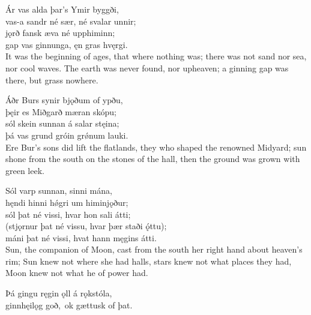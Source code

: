 \bva Ár vas alda \hld þar's Ymir byggði,\footnotemark[6] \\%
vas-a sandr né sær, \hld né svalar unnir; \\%
jǫrð fansk æva \hld né upphiminn; \\%
gap vas ginnunga, \hld ęn gras hvęrgi.
\\%

\bvb It was the beginning of ages, that where nothing was\footnotemark[8]; there was not sand nor sea, nor cool waves. The earth was never found, nor upheaven; a ginning gap was there, but grass nowhere. 

\bva Áðr Burs synir \hld bjǫðum of ypðu, \\%
þęir es Miðgarð \hld mæran skópu; \\%
sól skein sunnan \hld á salar stęina; \\%
þá vas grund gróin \hld grǿnum lauki.\\%

\bvb Ere Bur's sons did lift the flatlands, they who shaped the renowned Midyard; sun shone from the south on the stones of the hall, then the ground was grown with green leek.

\bva Sól varp sunnan, \hld sinni mána,\footnotemark[10] \\%
hęndi hinni hǿgri \hld um himinjǫður; \\%
sól þat né vissi, \hld hvar hon sali átti; \\%
(stjǫrnur þat né vissu, \hld hvar þær staði ǫ́ttu); \\%
máni þat né vissi, \hld hvat hann męgins átti.
\\%

\bvb Sun, the companion of Moon, cast from the south her right hand about heaven's rim; Sun knew not where she had halls, stars knew not what places they had, Moon knew not what he of power had.

\bva Þá gingu ręgin ǫll \hld á rǫkstóla, \\%
ginnhęilǫg goð, \hld ok gættusk of þat.\footnotemark[20] \\%
\\%

